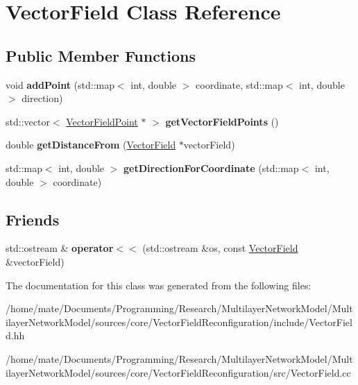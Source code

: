 \hypertarget{classVectorField}{}\section{Vector\+Field Class Reference}
\label{classVectorField}
\subsection*{Public Member Functions}
\begin{DoxyCompactItemize}
\item 
void {\bfseries add\+Point} (std\+::map$<$ int, double $>$ coordinate, std\+::map$<$ int, double $>$ direction)\hypertarget{classVectorField_ac72253d7b3410d3ef4ea520fded2d1f1}{}\label{classVectorField_ac72253d7b3410d3ef4ea520fded2d1f1}

\item 
std\+::vector$<$ \hyperlink{classVectorFieldPoint}{Vector\+Field\+Point} $\ast$ $>$ {\bfseries get\+Vector\+Field\+Points} ()\hypertarget{classVectorField_a79f35e239c04f89a3987f8ae70b49ef9}{}\label{classVectorField_a79f35e239c04f89a3987f8ae70b49ef9}

\item 
double {\bfseries get\+Distance\+From} (\hyperlink{classVectorField}{Vector\+Field} $\ast$vector\+Field)\hypertarget{classVectorField_a9cf9f0a60b62422a406a8530e10ed402}{}\label{classVectorField_a9cf9f0a60b62422a406a8530e10ed402}

\item 
std\+::map$<$ int, double $>$ {\bfseries get\+Direction\+For\+Coordinate} (std\+::map$<$ int, double $>$ coordinate)\hypertarget{classVectorField_ae8f028240c6b4ba60815660a887b92a4}{}\label{classVectorField_ae8f028240c6b4ba60815660a887b92a4}

\end{DoxyCompactItemize}
\subsection*{Friends}
\begin{DoxyCompactItemize}
\item 
std\+::ostream \& {\bfseries operator$<$$<$} (std\+::ostream \&os, const \hyperlink{classVectorField}{Vector\+Field} \&vector\+Field)\hypertarget{classVectorField_a305be31f220fc6801fa91592e7a08a9b}{}\label{classVectorField_a305be31f220fc6801fa91592e7a08a9b}

\end{DoxyCompactItemize}


The documentation for this class was generated from the following files\+:\begin{DoxyCompactItemize}
\item 
/home/mate/\+Documents/\+Programming/\+Research/\+Multilayer\+Network\+Model/\+Multilayer\+Network\+Model/sources/core/\+Vector\+Field\+Reconfiguration/include/Vector\+Field.\+hh\item 
/home/mate/\+Documents/\+Programming/\+Research/\+Multilayer\+Network\+Model/\+Multilayer\+Network\+Model/sources/core/\+Vector\+Field\+Reconfiguration/src/Vector\+Field.\+cc\end{DoxyCompactItemize}
